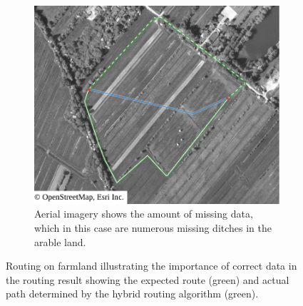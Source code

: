 \begin{figure}[h!]
\begin{minipage}[t]{.48\textwidth}
\begin{subfigure}[t]{\linewidth}
						\includegraphics[width=\textwidth]{images/qgis-routing-rural-routing-6-aerial}
						\caption{Aerial imagery shows the amount of missing data, which in this case are numerous missing ditches in the arable land.}
						\label{fig:eval-rural-routing-6-aerial}
					\end{subfigure}
				\end{minipage}
				\caption{Routing on farmland illustrating the importance of correct data in the routing result showing the expected route (green) and actual path determined by the hybrid routing algorithm (green).}
				\label{fig:eval-rural-routing-6}
			\end{figure}
			
